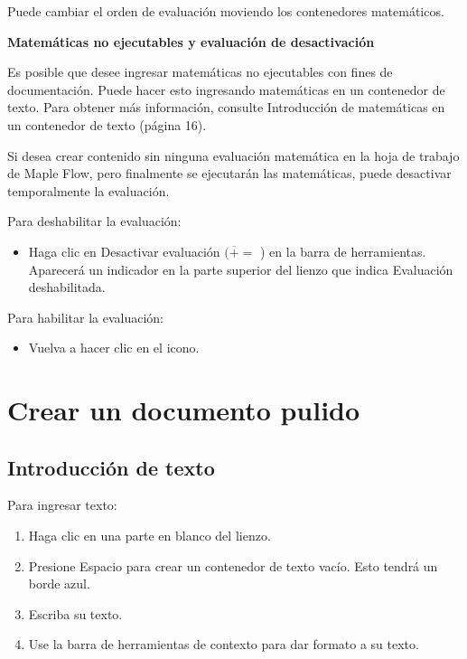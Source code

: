 
Puede cambiar el orden de evaluación moviendo los contenedores matemáticos.

\textbf{Matemáticas no ejecutables y evaluación de desactivación}

Es posible que desee ingresar matemáticas no ejecutables con fines de documentación. Puede hacer esto ingresando matemáticas en un contenedor de texto. Para obtener más información, consulte Introducción de matemáticas en un contenedor de texto (página 16).

Si desea crear contenido sin ninguna evaluación matemática en la hoja de trabajo de Maple Flow, pero finalmente se ejecutarán las matemáticas, puede desactivar temporalmente la evaluación.

Para deshabilitar la evaluación:

\begin{itemize}
  \item Haga clic en Desactivar evaluación $(\overline{+}=$ ) en la barra de herramientas. Aparecerá un indicador en la parte superior del lienzo que indica Evaluación deshabilitada.
\end{itemize}

Para habilitar la evaluación:
\begin{itemize}
  \item Vuelva a hacer clic en el icono.
\end{itemize}

\section{Crear un documento pulido}
\subsection{Introducción de texto}
Para ingresar texto:

\begin{enumerate}
  \item Haga clic en una parte en blanco del lienzo.

\item Presione Espacio para crear un contenedor de texto vacío. Esto tendrá un borde azul.

\item Escriba su texto.

\item Use la barra de herramientas de contexto para dar formato a su texto.
\end{enumerate}

